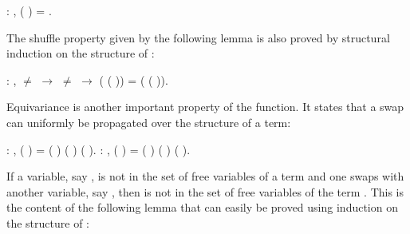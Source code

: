 \begin{coqdoccode}
\coqdocemptyline
\coqdocnoindent
{}  : \coqdockw{\ensuremath{\forall}}   ,    (   ) = .\coqdoceol
\coqdocemptyline
\end{coqdoccode}
The shuffle property given by the following lemma is also proved by structural induction on the structure of :
\begin{coqdoccode}
\coqdocemptyline
\coqdocnoindent
{}  : \coqdockw{\ensuremath{\forall}}    ,  \ensuremath{\not=}  \ensuremath{\rightarrow}  \ensuremath{\not=}  \ensuremath{\rightarrow} (   (   )) = (   (   )).\coqdoceol
\coqdocemptyline
\coqdocemptyline
\end{coqdoccode}
Equivariance is another important property of the  function. It states that a swap can uniformly be propagated over the structure of a term:
\begin{coqdoccode}
\coqdocemptyline
\coqdocnoindent
{}  : \coqdockw{\ensuremath{\forall}}     ,    (   ) =  (   ) (   ) (   ).\coqdoceol
\coqdocemptyline
\coqdocnoindent
{}  : \coqdockw{\ensuremath{\forall}}     ,    (   ) =  (   ) (   ) (   ).\coqdoceol
\coqdocemptyline
\end{coqdoccode}
If a variable, say , is not in the set of free variables of a term  and one swaps  with another variable, say , then  is not in the set of free variables of the term . This is the content of the following lemma that can easily be proved using induction on the structure of :
